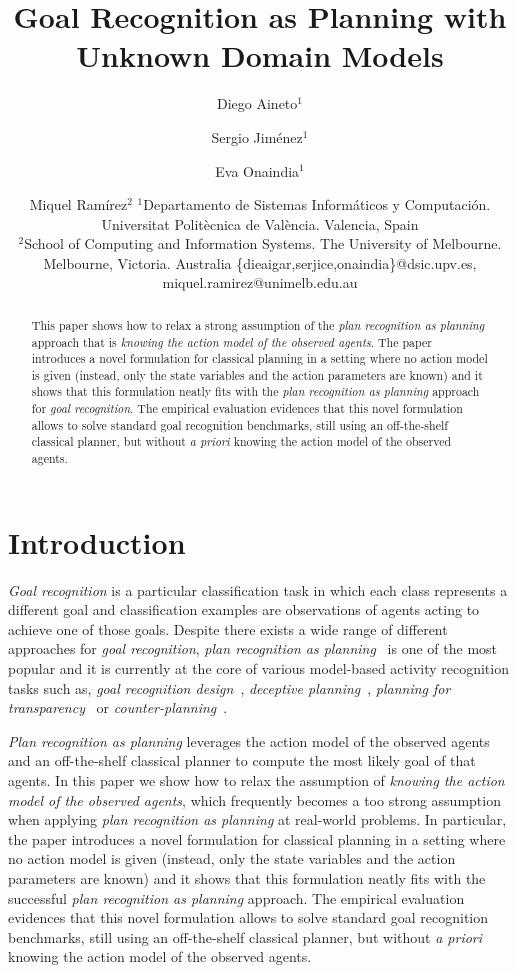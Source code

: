 \documentclass{article}
\title{Goal Recognition as Planning with Unknown Domain Models}
\author{
Diego Aineto$^1$\and
Sergio Jim\'enez$^1$\and
Eva Onaindia$^1$\And
\and
Miquel Ram\'irez$^2$
\affiliations
$^1${\small Departamento de Sistemas Inform\'aticos y Computaci\'on. Universitat Polit\`ecnica de Val\`encia. Valencia, Spain}\\
$^2${\small School of Computing and Information Systems. The University of Melbourne. Melbourne, Victoria. Australia}
\emails
{\scriptsize \{dieaigar,serjice,onaindia\}@dsic.upv.es, miquel.ramirez@unimelb.edu.au}}
\begin{document}
\maketitle

\begin{abstract}
This paper shows how to relax a strong assumption of the {\em plan recognition as planning} approach that is {\em knowing the action model of the observed agents}. The paper introduces a novel formulation for classical planning in a setting where no action model is given (instead, only the state variables and the action parameters are known) and it shows that this formulation neatly fits with the {\em plan recognition as planning} approach for {\em goal recognition}. The empirical evaluation evidences that this novel formulation allows to solve standard goal recognition benchmarks, still using an off-the-shelf classical planner, but without {\em a priori} knowing the action model of the observed agents.  
\end{abstract}

\section{Introduction}
\label{sec:introduction}
{\em Goal recognition} is a particular classification task in which each class represents a different goal and classification examples are observations of agents acting to achieve one of those goals. Despite there exists a wide range of different approaches for {\em goal recognition}, {\em plan recognition as planning}~\cite{ramirez2009plan,ramirez2012plan} is one of the most popular and it is currently at the core of various model-based activity recognition tasks such as, {\em goal recognition design}~\cite{KerenGK14}, {\em deceptive planning}~\cite{masters2017deceptive}, {\em planning for transparency}~\cite{macnally2018action} or {\em counter-planning}~\cite{PozancoEFB18}.

{\em Plan recognition as planning} leverages the action model of the observed agents and an off-the-shelf classical planner to compute the most likely goal of that agents. In this paper we show how to relax the assumption of {\em knowing the action model of the observed agents}, which frequently becomes a too strong assumption when applying {\em plan recognition as planning} at real-world problems.  In particular, the paper introduces a novel formulation for classical planning in a setting where no action model is given (instead, only the state variables and the action parameters are known) and it shows that this formulation neatly fits with the successful {\em plan recognition as planning} approach. The empirical evaluation evidences that this novel formulation allows to solve standard goal recognition benchmarks, still using an off-the-shelf classical planner, but without {\em a priori} knowing the action model of the observed agents.  
\end{document}
